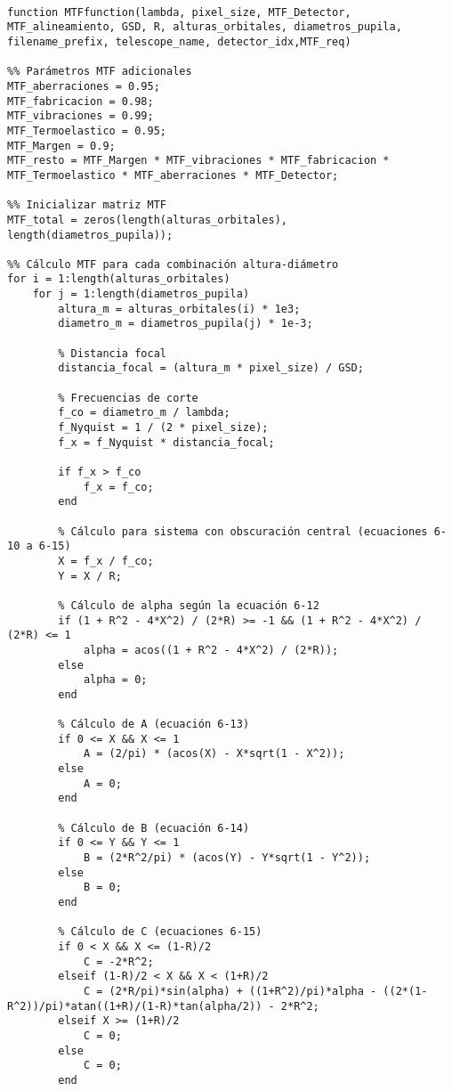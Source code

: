\begin{verbatim}

function MTFfunction(lambda, pixel_size, MTF_Detector, MTF_alineamiento, GSD, R, alturas_orbitales, diametros_pupila, filename_prefix, telescope_name, detector_idx,MTF_req)

%% Parámetros MTF adicionales
MTF_aberraciones = 0.95;
MTF_fabricacion = 0.98;
MTF_vibraciones = 0.99;
MTF_Termoelastico = 0.95;
MTF_Margen = 0.9;
MTF_resto = MTF_Margen * MTF_vibraciones * MTF_fabricacion * MTF_Termoelastico * MTF_aberraciones * MTF_Detector;

%% Inicializar matriz MTF
MTF_total = zeros(length(alturas_orbitales), length(diametros_pupila));

%% Cálculo MTF para cada combinación altura-diámetro
for i = 1:length(alturas_orbitales)
    for j = 1:length(diametros_pupila)
        altura_m = alturas_orbitales(i) * 1e3;
        diametro_m = diametros_pupila(j) * 1e-3;
        
        % Distancia focal
        distancia_focal = (altura_m * pixel_size) / GSD;
        
        % Frecuencias de corte
        f_co = diametro_m / lambda;
        f_Nyquist = 1 / (2 * pixel_size);
        f_x = f_Nyquist * distancia_focal;
        
        if f_x > f_co
            f_x = f_co;
        end
        
        % Cálculo para sistema con obscuración central (ecuaciones 6-10 a 6-15)
        X = f_x / f_co;
        Y = X / R;
        
        % Cálculo de alpha según la ecuación 6-12
        if (1 + R^2 - 4*X^2) / (2*R) >= -1 && (1 + R^2 - 4*X^2) / (2*R) <= 1
            alpha = acos((1 + R^2 - 4*X^2) / (2*R));
        else
            alpha = 0;
        end
        
        % Cálculo de A (ecuación 6-13)
        if 0 <= X && X <= 1
            A = (2/pi) * (acos(X) - X*sqrt(1 - X^2));
        else
            A = 0;
        end
        
        % Cálculo de B (ecuación 6-14)
        if 0 <= Y && Y <= 1
            B = (2*R^2/pi) * (acos(Y) - Y*sqrt(1 - Y^2));
        else
            B = 0;
        end
        
        % Cálculo de C (ecuaciones 6-15)
        if 0 < X && X <= (1-R)/2
            C = -2*R^2;
        elseif (1-R)/2 < X && X < (1+R)/2
            C = (2*R/pi)*sin(alpha) + ((1+R^2)/pi)*alpha - ((2*(1-R^2))/pi)*atan((1+R)/(1-R)*tan(alpha/2)) - 2*R^2;
        elseif X >= (1+R)/2
            C = 0;
        else
            C = 0;
        end
        

\end{verbatim}
